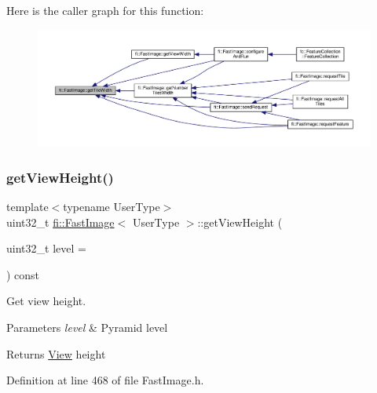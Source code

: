 Here is the caller graph for this function\+:
\nopagebreak
\begin{figure}[H]
\begin{center}
\leavevmode
\includegraphics[width=350pt]{dc/d6b/classfi_1_1FastImage_a4544e690ce41bfc0b4ca4e94f5ecd2b1_icgraph}
\end{center}
\end{figure}
\mbox{\label{classfi_1_1FastImage_a0a92ed9c575ad2664b1e96422375543c}} 
\subsubsection{\texorpdfstring{get\+View\+Height()}{getViewHeight()}}
{\footnotesize\ttfamily template$<$typename User\+Type$>$ \\
uint32\+\_\+t \hyperlink{classfi_1_1FastImage}{fi\+::\+Fast\+Image}$<$ User\+Type $>$\+::get\+View\+Height (\begin{DoxyParamCaption}\item[{uint32\+\_\+t}]{level = {} }\end{DoxyParamCaption}) const\hspace{0.3cm}{\ttfamily [inline]}}



Get view height. 


\begin{DoxyParams}{Parameters}
{\em level} & Pyramid level \\
\hline
\end{DoxyParams}
\begin{DoxyReturn}{Returns}
\hyperlink{classfi_1_1View}{View} height 
\end{DoxyReturn}


Definition at line 468 of file Fast\+Image.\+h.

